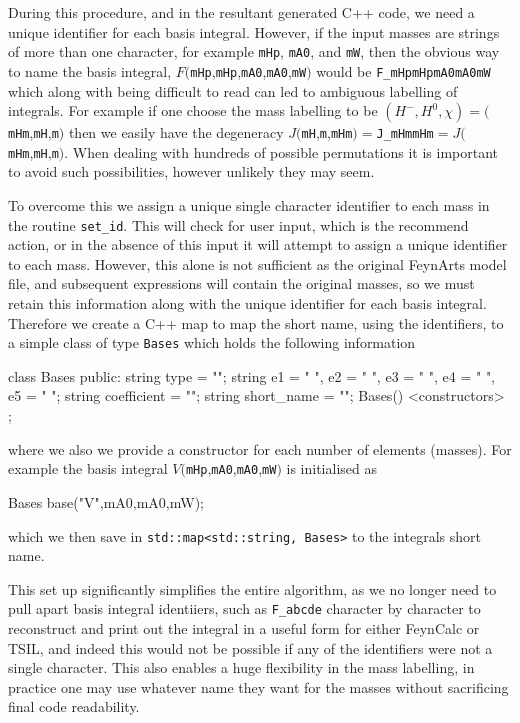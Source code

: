 During this procedure, and in the resultant generated C++ code, we need a unique identifier for each basis integral.  However, if the input masses are strings of more than one character, for example \lstinline{mHp}, \lstinline{mA0}, and \lstinline{mW}, then the obvious way to name the basis integral, $F($\lstinline{mHp},\lstinline{mHp},\lstinline{mA0},\lstinline{mA0},\lstinline{mW}$)$ would be \lstinline{F_mHpmHpmA0mA0mW} which along with being difficult to read can led to ambiguous labelling of integrals.  For example if one choose the mass labelling to be $(H^-, H^0, \chi ) = ($\lstinline{mHm},\lstinline{mH},\lstinline{m}$)$ then we easily have the degeneracy $J($\lstinline{mH},\lstinline{m},\lstinline{mHm}$) =  $\lstinline{J_mHmmHm}$ = J($\lstinline{mHm},\lstinline{mH},\lstinline{m}$)$.  When dealing with hundreds of possible permutations it is important to avoid such possibilities, however unlikely they may seem.

To overcome this we assign a unique single character identifier to each mass in the routine \lstinline{set_id}.  This will check for user input, which is the recommend action, or in the absence of this input it will attempt to assign a unique identifier to each mass.  However, this alone is not sufficient as the original FeynArts model file, and subsequent expressions will contain the original masses, so we must retain this information along with the unique identifier for each basis integral.  Therefore we create a C++ map to map the short name, using the identifiers, to a simple class of type \lstinline{Bases} which holds the following information
\begin{lstcpp}
class Bases
{
public:
string type = "";
string e1 = " ", e2 = " ", e3 = " ", e4 = " ", e5 = " ";
string coefficient = "";
string short_name = "";
Bases() {}
<constructors>
};
\end{lstcpp}
where we also we provide a constructor for each number of elements (masses).  For example the basis integral $V($\lstinline{mHp},\lstinline{mA0},\lstinline{mA0},\lstinline{mW}$)$ is initialised as\begin{lstcpp}
Bases base("V",mA0,mA0,mW);
\end{lstcpp}
which we then save in \lstinline{std::map<std::string, Bases>} to the integrals short name.

This set up significantly simplifies the entire algorithm, as we no longer need to pull apart basis integral identiiers, such as \lstinline{F_abcde} character by character to reconstruct and print out the integral in a useful form for either FeynCalc or TSIL, and indeed this would not be possible if any of the identifiers were not a single character.  This also enables a huge flexibility in the mass labelling, in practice one may use whatever name they want for the masses without sacrificing final code readability.



